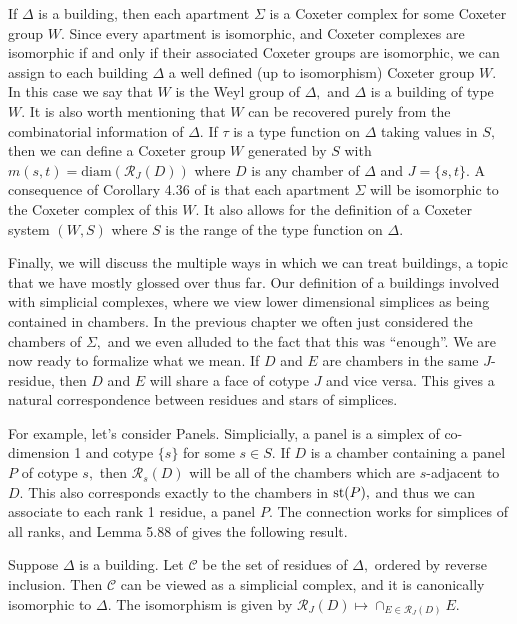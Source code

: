 \documentclass[class=book, crop=false,12 pt]{standalone}
\begin{document}
If $\Delta$ is a building, then each apartment $\Sigma$ is a Coxeter complex for some Coxeter group $W.$ Since every apartment is isomorphic, and Coxeter complexes are isomorphic if and only if their associated Coxeter groups are isomorphic, we can assign to each building $\Delta$ a well defined (up to isomorphism) Coxeter group $W.$ In this case we say that $W$ is the Weyl group of $\Delta,$ and $\Delta$ is a building of type $W.$ It is also worth mentioning that $W$ can be recovered purely from the combinatorial information of $\Delta.$ If $\tau$ is a type function on $\Delta$ taking values in $S,$ then we can define a Coxeter group $W$ generated by $S$ with $m(s,t)=\mathrm{diam}(\mathcal{R}_J(D))$ where $D$ is any chamber of $\Delta$ and $J=\{s,t\}.$ A consequence of Corollary 4.36 of \cite{buildings} is that each apartment $\Sigma$ will be isomorphic to the Coxeter complex of this $W.$ It also allows for the definition of a Coxeter system $(W,S)$ where $S$ is the range of the type function on $\Delta.$

Finally, we will discuss the multiple ways in which we can treat buildings, a topic that we have mostly glossed over thus far. Our definition of a buildings involved with simplicial complexes, where we view lower dimensional simplices as being contained in chambers. In the previous chapter we often just considered the chambers of $\Sigma,$ and we even alluded to the fact that this was ``enough''. We are now ready to formalize what we mean. If $D$ and $E$ are chambers in the same $J$-residue, then $D$ and $E$ will share a face of cotype $J$ and vice versa. This gives a natural correspondence between residues and stars of simplices.

For example, let's consider Panels. Simplicially, a panel is a simplex of co-dimension 1 and cotype $\{s\}$ for some $s\in S.$ If $D$ is a chamber containing a panel $P$ of cotype $s,$ then $\mathcal{R}_s(D)$ will be all of the chambers which are $s$-adjacent to $D.$ This also corresponds exactly to the chambers in $\mathrm{st}(P),$ and thus we can associate to each rank 1 residue, a panel $P.$ The connection works for simplices of all ranks, and Lemma 5.88 of \cite{buildings} gives the following result.

\begin{theorem}
	\label{thm:sim-cham}
	Suppose $\Delta$ is a building. Let $\mathcal{C}$ be the set of residues of $\Delta,$ ordered by reverse inclusion. Then $\mathcal{C}$ can be viewed as a simplicial complex, and it is canonically isomorphic to $\Delta.$ The isomorphism is given by $\mathcal{R}_J(D)\mapsto \cap_{E\in \mathcal{R}_J(D)}E.$
\end{theorem}
\end{document}
